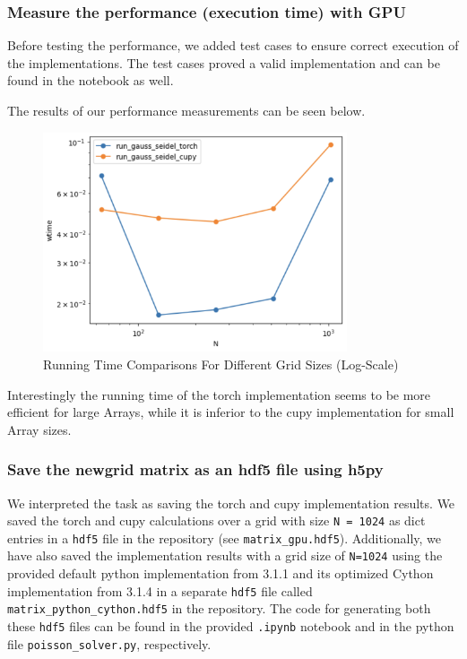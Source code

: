 \documentclass[a4paper,12pt]{article}
\begin{document}
\subsubsection{Measure the performance (execution time) with GPU}
Before testing the performance, we added test cases to ensure correct execution of the implementations.
The test cases proved a valid implementation and can be found in the notebook as well.

The results of our performance measurements can be seen below.
\begin{figure}[H]
  \centering
  \includegraphics[width=0.8\textwidth]{images/cupy_torch_gpu.png}
  \caption{Running Time Comparisons For Different Grid Sizes (Log-Scale)}
\end{figure}

 Interestingly the running time of the torch implementation seems to be more efficient for large Arrays, while it is
 inferior to the cupy implementation for small Array sizes.

\subsubsection{Save the newgrid matrix as an hdf5 file using h5py }
We interpreted the task as saving the torch and cupy implementation results. We saved the torch and cupy calculations over a grid with size \verb|N = 1024|
as dict entries in a \verb|hdf5| file in the repository (see \verb|matrix_gpu.hdf5|). Additionally, we have also saved the implementation results with a grid size of \verb|N=1024| using the provided default python implementation from 3.1.1 and its optimized Cython implementation from 3.1.4 in a separate \verb|hdf5| file called \verb|matrix_python_cython.hdf5| in the repository. The code for generating both these \verb|hdf5| files can be found in the provided \verb|.ipynb| notebook and in the python file \verb|poisson_solver.py|, respectively.
\end{document}
